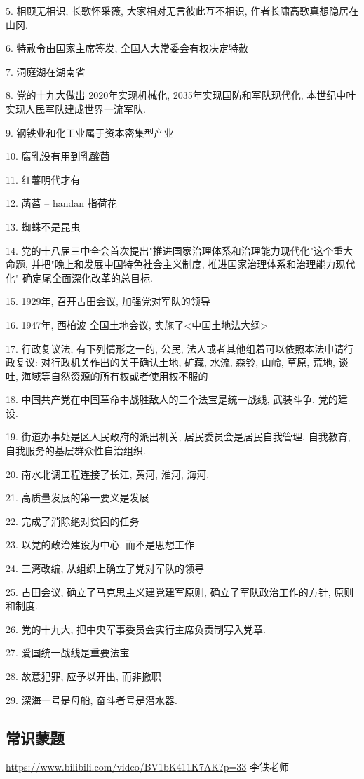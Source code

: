 \documentclass[UTF8]{ctexart}
\begin{document}
5. 相顾无相识, 长歌怀采薇, 大家相对无言彼此互不相识, 作者长啸高歌真想隐居在山冈.

6. 特赦令由国家主席签发, 全国人大常委会有权决定特赦

7. 洞庭湖在湖南省

8. 党的十九大做出 2020年实现机械化, 2035年实现国防和军队现代化, 本世纪中叶实现人民军队建成世界一流军队.

9. 钢铁业和化工业属于资本密集型产业

10. 腐乳没有用到乳酸菌

11. 红薯明代才有

12. 菡萏  -- handan 指荷花

13. 蜘蛛不是昆虫

14. 党的十八届三中全会首次提出"推进国家治理体系和治理能力现代化"这个重大命题, 并把"晚上和发展中国特色社会主义制度, 推进国家治理体系和治理能力现代化" 确定尾全面深化改革的总目标.

15. 1929年, 召开古田会议, 加强党对军队的领导

16. 1947年, 西柏波 全国土地会议,  实施了<中国土地法大纲>

17. 行政复议法, 有下列情形之一的, 公民, 法人或者其他组着可以依照本法申请行政复议: 对行政机关作出的关于确认土地, 矿藏, 水流, 森铃, 山岭, 草原, 荒地, 谈吐, 海域等自然资源的所有权或者使用权不服的

18.  中国共产党在中国革命中战胜敌人的三个法宝是统一战线, 武装斗争, 党的建设.

19. 街道办事处是区人民政府的派出机关, 居民委员会是居民自我管理, 自我教育, 自我服务的基层群众性自治组织.

20. 南水北调工程连接了长江, 黄河, 淮河, 海河.

21. 高质量发展的第一要义是发展

22. 完成了消除绝对贫困的任务

23. 以党的政治建设为中心. 而不是思想工作

24. 三湾改编, 从组织上确立了党对军队的领导

25. 古田会议, 确立了马克思主义建党建军原则, 确立了军队政治工作的方针, 原则和制度.

26. 党的十九大, 把中央军事委员会实行主席负责制写入党章.

27. 爱国统一战线是重要法宝

28. 故意犯罪, 应予以开出, 而非撤职

29. 深海一号是母船, 奋斗者号是潜水器.



\subsection{常识蒙题}
\url{https://www.bilibili.com/video/BV1bK411K7AK?p=33}  李铁老师
\end{document}
